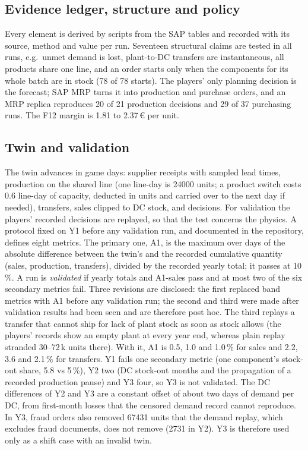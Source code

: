 \documentclass{ifacconf}
\begin{document}
\subsection{Evidence ledger, structure and policy}
Every element is derived by scripts from the SAP tables and recorded with its source, method and value per run.
Seventeen structural claims are tested in all runs, e.g.\ unmet demand is lost, plant-to-DC transfers are
instantaneous, all products share one line, and an order starts only when the components for its whole batch are
in stock (78 of 78 starts). The players' only planning decision is the forecast; SAP MRP turns it into production
and purchase orders, and an MRP replica reproduces 20 of 21 production decisions and 29 of 37 purchasing runs.
The F12 margin is 1.81 to 2.37\,\euro{} per unit.

\subsection{Twin and validation}
The twin advances in game days: supplier receipts with sampled lead times, production on the shared line (one
line-day is \num{24000} units; a product switch costs 0.6 line-day of capacity, deducted in units and carried
over to the next day if needed), transfers, sales clipped to DC stock, and decisions. For validation the players' recorded decisions are
replayed, so that the test concerns the physics. A protocol fixed on Y1 before any validation run, and documented
in the repository, defines eight metrics. The primary one, A1, is the maximum over days of the absolute
difference between the twin's and the recorded cumulative quantity (sales, production, transfers), divided by
the recorded yearly total; it passes at 10\,\%. A run is \emph{validated} if yearly totals and A1-sales pass and
at most two of the six secondary metrics fail. Three revisions are disclosed: the first replaced band metrics
with A1 before any validation run; the second and third were made after validation results had been seen and are
therefore post hoc. The third replays a transfer that cannot ship for lack of plant stock as soon as stock allows
(the players' records show an empty plant at every year end, whereas plain replay stranded 30--72\,k units there).
With it, A1 is 0.5, 1.0 and 1.0\,\% for sales and 2.2, 3.6 and 2.1\,\% for transfers. Y1 fails one secondary metric
(one component's stock-out share, 5.8 vs 5\,\%), Y2 two (DC stock-out months and the propagation of a recorded
production pause) and Y3 four, so Y3 is not validated. The DC differences of Y2 and Y3 are a constant offset of about two days
of demand per DC, from first-month losses that the censored demand record cannot reproduce. In Y3, fraud orders also removed \num{67431} units that the demand replay, which
excludes fraud documents, does not remove (\num{2731} in Y2). Y3 is therefore used only as a shift case with an
invalid twin.
\end{document}
